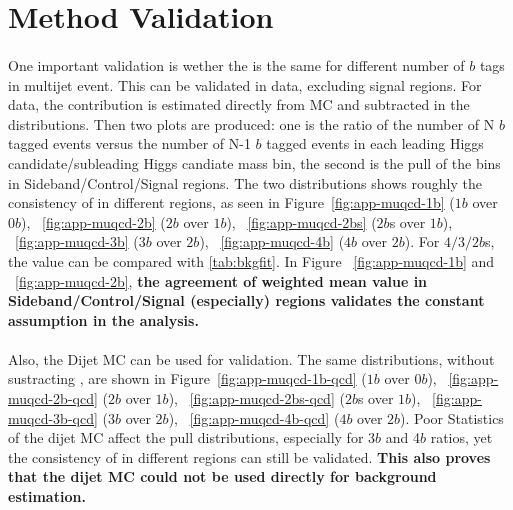 \section{\muqcd Method Validation}
\label{app:muqcd-study}
\paragraph{}
One important validation is wether the \muqcd is the same for different number of $b$ tags in multijet event. This can be validated in data, excluding signal regions. For data, the \ttbar contribution is estimated directly from MC and subtracted in the distributions. Then two plots are produced: one is the ratio of the number of N $b$ tagged events versus the number of N-1 $b$ tagged events in each leading Higgs candidate/subleading Higgs candiate mass bin, the second is the pull of the bins in Sideband/Control/Signal regions. The two distributions shows roughly the consistency of \muqcd in different regions, as seen in Figure~\ref{fig:app-muqcd-1b} ($1b$ over $0b$), ~\ref{fig:app-muqcd-2b} ($2b$ over $1b$), ~\ref{fig:app-muqcd-2bs} ($2b$s over $1b$), ~\ref{fig:app-muqcd-3b} ($3b$ over $2b$), ~\ref{fig:app-muqcd-4b} ($4b$ over $2b$). For $4/3/2b$s, the \muqcd value can be compared with \ref{tab:bkgfit}. In Figure ~\ref{fig:app-muqcd-1b} and ~\ref{fig:app-muqcd-2b}, \textbf{the agreement of \muqcd weighted mean value in Sideband/Control/Signal (especially) regions validates the constant \muqcd assumption in the analysis.}

\paragraph{}
Also, the Dijet MC can be used for validation. The same distributions, without sustracting \ttbar, are shown in Figure~\ref{fig:app-muqcd-1b-qcd} ($1b$ over $0b$), ~\ref{fig:app-muqcd-2b-qcd} ($2b$ over $1b$), ~\ref{fig:app-muqcd-2bs-qcd} ($2b$s over $1b$), ~\ref{fig:app-muqcd-3b-qcd} ($3b$ over $2b$), ~\ref{fig:app-muqcd-4b-qcd} ($4b$ over $2b$).  Poor Statistics of the dijet MC affect the pull distributions, especially for 3$b$ and 4$b$ ratios, yet the consistency of \muqcd in different regions can still be validated. \textbf{This also proves that the dijet MC could not be used directly for background estimation.}

